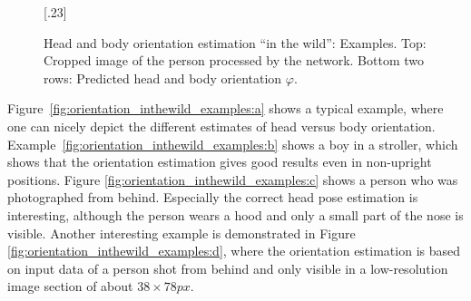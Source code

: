 \documentclass[a4paper, 10pt, conference]{ieeeconf}
\begin{document}
\begin{figure}
{{   }
  \subcaptionbox{\label{fig:orientation_inthewild_examples:d}}[.23\columnwidth]{   }}
  \caption[Head and body orientation estimation \enquote{in the wild}: Examples]{Head and body orientation estimation \enquote{in the wild}: Examples. Top: Cropped image of the person processed by the network. Bottom two rows: Predicted head and body orientation $\varphi$.}
  \label{fig:orientation_inthewild_examples}
\end{figure}

Figure~\ref{fig:orientation_inthewild_examples:a} shows a typical example, where one can nicely depict the different estimates of head versus body orientation. Example~\ref{fig:orientation_inthewild_examples:b} shows a boy in a stroller, which shows that the orientation estimation gives good results even in non-upright positions. Figure \ref{fig:orientation_inthewild_examples:c} shows a person who was photographed from behind. Especially the correct head pose estimation is interesting, although the person wears a hood and only a small part of the nose is visible. Another interesting example is demonstrated in Figure \ref{fig:orientation_inthewild_examples:d}, where the orientation estimation is based on input data of a person shot from behind and only visible in a low-resolution image section of about $38\times78px$. 
\end{document}
